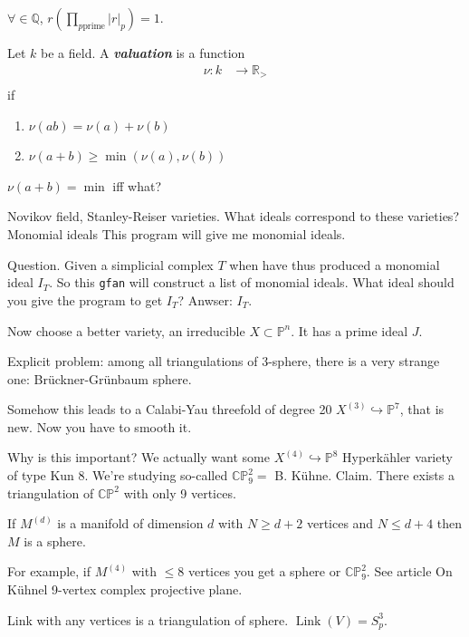 \documentclass{article}
\numberwithin{equation}{section}
\newcommand{\R}{\mathbb{R}}
\newcommand{\C}{\mathbb{C}}
\newcommand{\Q}{\mathbb{Q}}
\begin{document}
	$\forall\in\Q$, $r\left( \prod_{p\text{prime}}|r|_p \right) =1$.
\begin{definition}
	Let $k$ be a field. A \textit{\textbf{valuation}} is a function
	\begin{align*}
		\nu: k &\longrightarrow\R_{>}  \\
	\end{align*}
	if
	\begin{enumerate}
		\item $\nu(ab)=\nu(a)+\nu(b)$
		\item $\nu(a+b)\geq \min(\nu(a),\nu(b))$
	\end{enumerate}
\end{definition}
$\nu(a+b)=\min$ iff what?


Novikov field, Stanley-Reiser varieties. What ideals correspond to these varieties? Monomial ideals This program will give me monomial ideals.

Question. Given a simplicial complex $T$ when have thus produced a monomial ideal $I_T$. So this \texttt{gfan} will construct a list of monomial ideals. What ideal should you give the program to get $I_T$? Anwser: $I_T$.

Now choose a better variety, an irreducible $X\subset \mathbb{P}^n$. It has a prime ideal $J$.

Explicit problem: among all triangulations of 3-sphere, there is a very strange one: Br\"uckner-Gr\"unbaum sphere.

Somehow this leads to a Calabi-Yau threefold of degree 20 $X^{(3)}\hookrightarrow\mathbb{P}^7$, that is new. Now you have to smooth it.

Why is this important? We actually want some $X^{(4)}\hookrightarrow\mathbb{P}^8$ Hyperk\"ahler variety of type Kun 8. We're studying so-called $\C\mathbb{P}^2_9=$ B. K\"uhne. Claim. There exists a triangulation of $\C\mathbb{P}^2$ with only 9 vertices.

\begin{thm}[who?]
	If $M^(d)$ is a manifold of dimension $d$ with $N\geq d+2$ vertices and $N\leq d+4$ then $M$ is a sphere.
\end{thm}
For example, if $M^{(4)}$ with $\leq 8$ vertices you get a sphere or $\C\mathbb{P}^2_9$. See article On K\"uhnel 9-vertex complex projective plane.

{\color{cyan}Link with any vertices is a triangulation of sphere. $\operatorname{Link}(V)=S_p^3$.}
\end{document}
